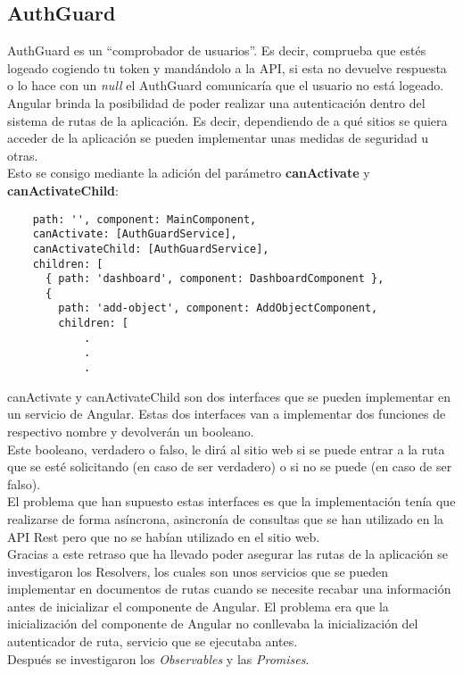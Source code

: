 \subsection{AuthGuard}
AuthGuard es un ``comprobador de usuarios''. Es decir, comprueba que estés logeado cogiendo tu token y mandándolo a la API, si esta no devuelve respuesta o lo hace con un \textit{null} el AuthGuard comunicaría que el usuario no está logeado.
\\Angular brinda la posibilidad de poder realizar una autenticación dentro del sistema de rutas de la aplicación. Es decir, dependiendo de a qué sitios se quiera acceder de la aplicación se pueden implementar unas medidas de seguridad u otras.
\\Esto se consigo mediante la adición del parámetro \textbf{canActivate} y \textbf{canActivateChild}:
\begin{verbatim}
    path: '', component: MainComponent, 
    canActivate: [AuthGuardService],
    canActivateChild: [AuthGuardService],
    children: [
      { path: 'dashboard', component: DashboardComponent },
      {
        path: 'add-object', component: AddObjectComponent,
        children: [
            .
            .
            .
\end{verbatim}
canActivate y canActivateChild son dos interfaces que se pueden implementar en un servicio de Angular. Estas dos interfaces van a implementar dos funciones de respectivo nombre y devolverán un booleano.
\\Este booleano, verdadero o falso, le dirá al sitio web si se puede entrar a la ruta que se esté solicitando (en caso de ser verdadero) o si no se puede (en caso de ser falso).
\\El problema que han supuesto estas interfaces es que la implementación tenía que realizarse de forma asíncrona, asincronía de consultas que se han utilizado en la API Rest pero que no se habían utilizado en el sitio web.
\\Gracias a este retraso que ha llevado poder asegurar las rutas de la aplicación se investigaron los Resolvers, los cuales son unos servicios que se pueden implementar en documentos de rutas cuando se necesite recabar una información antes de inicializar el componente de Angular. El problema era que la inicialización del componente de Angular no conllevaba la inicialización del autenticador de ruta, servicio que se ejecutaba antes.
\\Después se investigaron los \textit{Observables} y las \textit{Promises}.

